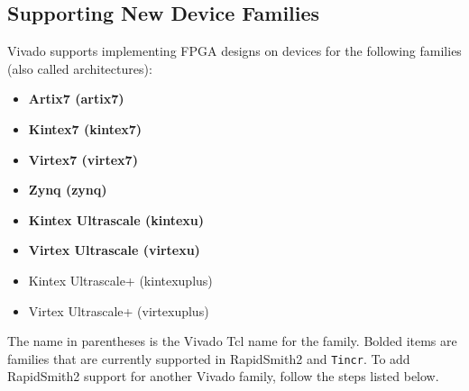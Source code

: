 \subsection{Supporting New Device Families} \label{sec:newFamilies}
Vivado supports implementing FPGA designs on devices for the following families
(also called architectures):

\begin{multicols}{2}
	\begin {itemize}
	  \item \textbf{Artix7 (artix7)}
	  \item \textbf{Kintex7 (kintex7)}
	  \item \textbf{Virtex7 (virtex7)}
	  \item \textbf{Zynq (zynq)}
	  \item \textbf{Kintex Ultrascale (kintexu)}
	  \item \textbf{Virtex Ultrascale (virtexu)}
	  \item Kintex Ultrascale+ (kintexuplus)
	  \item Virtex Ultrascale+ (virtexuplus)
	\end{itemize}
\end{multicols}

\noindent The name in parentheses is the Vivado Tcl name for the family. Bolded
items are families that are currently supported in RapidSmith2 and
\texttt{Tincr}. To add RapidSmith2 support for another Vivado family, follow the
steps listed below.

